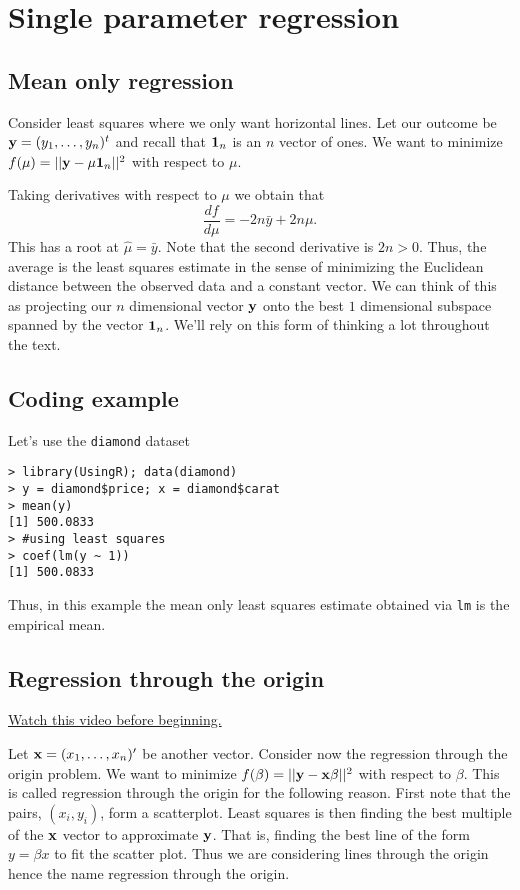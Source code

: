 \chapter{Single parameter regression}

\section{Mean only regression}



Consider least squares where we only want horizontal lines. 
Let our outcome be
$
\mathbf{y} = (y_1,\ldots, y_n)^t
$ and recall that $\mathbf{1}_n$ is an $n$ vector of ones. We want
to minimize 
${f(\mu) = ||\mathbf{y} - \mu \mathbf{1}_n||^2}$ with respect to $\mu$. 

Taking derivatives with respect to $\mu$ we obtain that
$$
\frac{d f}{d\mu} = - 2n \bar y  + 2 n \mu.
$$
This has a root at $\hat \mu = \bar y$. Note that the second
derivative is $2n>0$. 
Thus, the average is the least squares estimate in the
sense of minimizing the Euclidean distance between the
observed data and a constant vector. We can think of this
as projecting our $n$ dimensional vector $\mathbf{y}$ onto the best $1$
dimensional subspace spanned by the vector $\mathbf{1}_n$. We'll
rely on this form of thinking a lot throughout the text.

\section{Coding example}

Let's use the \texttt{diamond} dataset 
\begin{verbatim}
> library(UsingR); data(diamond)
> y = diamond$price; x = diamond$carat
> mean(y)
[1] 500.0833
> #using least squares
> coef(lm(y ~ 1))
[1] 500.0833
\end{verbatim}
Thus, in this example the mean only least squares estimate obtained via \texttt{lm} is the empirical mean.

\section{Regression through the origin}

\href{https://www.youtube.com/watch?v=1ZFED8AcHWc&index=7&list=PLpl-gQkQivXhdgUCdaUQcdb31CRe8Mm2y}{Watch this video before beginning.}

Let $\mathbf{x} = (x_1,\ldots, x_n)'$ be another vector. Consider now the
regression through the origin problem. We want to minimize
$f(\beta) = ||\mathbf{y} - \mathbf{x} \beta ||^2$ with respect to $\beta$.
This is called regression through the origin for the following
reason. First note that the pairs, $(x_i, y_i)$,
form a scatterplot. Least squares is then finding the best
multiple of the $\mathbf{x}$ vector to approximate $\mathbf{y}$. That is,
finding the best line of the form $y = \beta x$ to fit
the scatter plot. Thus we are considering lines through the origin
hence the name regression through the origin.

